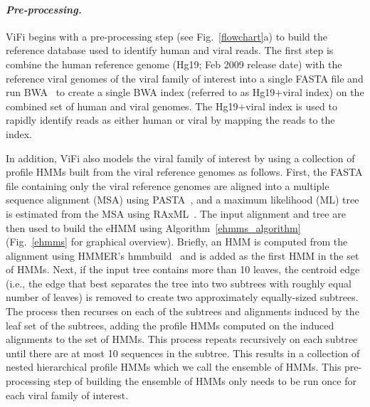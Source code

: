 \documentclass{bmcart}
\begin{document}


\paragraph{\emph{Pre-processing.}} ViFi begins with a pre-processing step (see Fig.~\ref{flowchart}a) to build the reference database used to identify human and viral reads.  The first step is combine the human reference genome (Hg19; Feb 2009 release date) with the reference viral genomes of the viral family of interest into a single FASTA file and run BWA~\cite{Li2009} to create a single BWA index (referred to as Hg19+viral index) on the combined set of human and viral genomes.  The Hg19+viral index is used to rapidly identify reads as either human or viral by mapping the reads to the index.  

In addition, ViFi also models the viral family of interest by using a collection of profile HMMs built from the viral reference genomes as follows.  First, the FASTA file containing only the viral reference genomes are aligned into a multiple sequence alignment (MSA) using PASTA~\cite{Mirarab2014}, and a maximum likelihood (ML) tree is estimated from the MSA using RAxML~\cite{Stamatakis2014}.  The input alignment and tree are then used to build the eHMM using Algorithm~\ref{ehmms_algorithm} (Fig.~\ref{ehmms} for graphical overview).  Briefly, an HMM is computed from the alignment using HMMER's hmmbuild~\cite{Eddy1998} and is added as the first HMM in the set of HMMs.  Next, if the input tree contains more than 10 leaves, the centroid edge (i.e., the edge that best separates the tree into two subtrees with roughly equal number of leaves) is removed to create two approximately equally-sized subtrees.  The process then recurses on each of the subtrees and alignments induced by the leaf set of the subtrees, adding the profile HMMs computed on the induced alignments to the set of HMMs.  This process repeats recursively on each subtree until there are at most 10 sequences in the subtree.  This results in a collection of nested hierarchical profile HMMs which we call the ensemble of HMMs.  This pre-processing step of building the ensemble of HMMs only needs to be run once for each viral family of interest.
\end{document}
